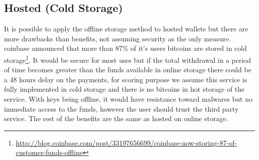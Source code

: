 \subsection{Hosted (Cold Storage)} 
It is possible to apply the offline storage method to hosted wallets but there are more drawbacks than benefits, not assuming security as the only measure. coinbase announced that more than 87\% of it's users bitcoins are stored in cold storage\footnote{\url {http://blog.coinbase.com/post/33197656699/coinbase-now-storing-87-of-customer-funds-offline}}. It would be secure for most uses but if the total withdrawal in a period of time becomes greater than the funds available in online storage there could be a 48 hours delay on the payments, for scoring purpose we assume this service is fully implemented in cold storage and there is no bitcoins in hot storage of the service.
With keys being offline, it would have resistance toward malwares but no immediate access to the funds, however the user should trust the third party service. The rest of the benefits are the same as hosted on online storage.
